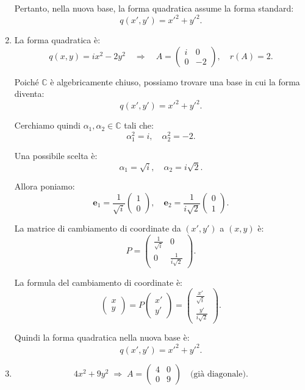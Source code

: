 \documentclass{article}
\theoremstyle{plain}
\theoremstyle{definition}
\theoremstyle{remark}
\begin{document}
\begin{enumerate}
Pertanto, nella nuova base, la forma quadratica assume la forma standard:
\[
q(x', y') = x'^2 + y'^2.
\]

    \item La forma quadratica è:
\[
q(x, y) = ix^2 - 2y^2 \quad \Rightarrow \quad A = 
\begin{pmatrix}
i & 0 \\
0 & -2
\end{pmatrix},
\quad r(A) = 2.
\]

Poiché \(\mathbb{C}\) è algebricamente chiuso, possiamo trovare una base in cui la forma diventa:
\[
q(x', y') = x'^2 + y'^2.
\]

Cerchiamo quindi \(\alpha_1, \alpha_2 \in \mathbb{C}\) tali che:
\[
\alpha_1^2 = i, \quad \alpha_2^2 = -2.
\]

Una possibile scelta è:
\[
\alpha_1 = \sqrt{i}, \quad \alpha_2 = i\sqrt{2}.
\]

Allora poniamo:
\[
\mathbf{e}_1 = \frac{1}{\sqrt{i}} \begin{pmatrix}1\\0\end{pmatrix}, \quad
\mathbf{e}_2 = \frac{1}{i\sqrt{2}} \begin{pmatrix}0\\1\end{pmatrix}.
\]

La matrice di cambiamento di coordinate da \((x', y')\) a \((x, y)\) è:
\[
P = 
\begin{pmatrix}
\frac{1}{\sqrt{i}} & 0 \\
0 & \frac{1}{i\sqrt{2}}
\end{pmatrix}.
\]

La formula del cambiamento di coordinate è:
\[
\begin{pmatrix}
x \\
y
\end{pmatrix}
= P
\begin{pmatrix}
x' \\
y'
\end{pmatrix}
=
\begin{pmatrix}
\frac{x'}{\sqrt{i}}  \\
\frac{y'}{i\sqrt{2}} 
\end{pmatrix}.
\]

Quindi la forma quadratica nella nuova base è:
\[
q(x', y') = x'^2 + y'^2.
\]

    \item \[
4x^2 + 9y^2 \;\Rightarrow\;
A = \begin{pmatrix}
4 & 0 \\
0 & 9
\end{pmatrix}
\quad \text{(già diagonale)}.
\]


\end{enumerate}
\end{document}
